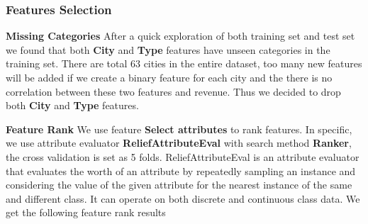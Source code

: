 \documentclass[10pt, oneside]{article}   	%
\begin{document}
\subsubsection{Features Selection}

{\bf Missing Categories} 
After a quick exploration of both training set and test set we found that both {\bf City} and {\bf Type} features have unseen categories in the training set.
There are total 63 cities in the entire dataset, too many new features will be added if we create a binary feature for each city and 
the there is no correlation between these two features and revenue.
Thus we decided to drop both {\bf City} and {\bf Type} features.

{\bf Feature Rank}
We use feature \textbf{Select attributes} to rank features. In specific, we use attribute evaluator \textbf{ReliefAttributeEval} with search method \textbf{Ranker}, the cross validation is set as 5 folds. ReliefAttributeEval is an attribute evaluator that evaluates the worth of an attribute by repeatedly sampling an instance and considering the value of the given attribute for the nearest instance of the same and different class. It can operate on both discrete and continuous class data. We get the following feature rank results
\end{document}
